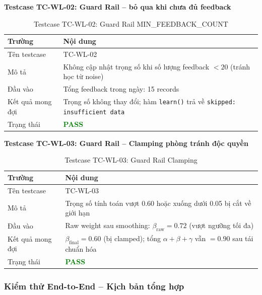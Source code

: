 \documentclass[12pt,a4paper]{report}
\begin{document}
\textbf{Testcase TC-WL-02: Guard Rail -- bỏ qua khi chưa đủ feedback}

\begin{table}[htbp]
\centering
\renewcommand{\arraystretch}{1.3}
\begin{tabular}{|l|p{8cm}|}
\hline
\rowcolor[HTML]{EFEFEF}
\textbf{Trường} & \textbf{Nội dung} \\ \hline
Tên testcase & TC-WL-02 \\ \hline
Mô tả & Không cập nhật trọng số khi số lượng feedback $< 20$ (tránh học từ noise) \\ \hline
Đầu vào & Tổng feedback trong ngày: 15 records \\ \hline
Kết quả mong đợi & Trọng số không thay đổi; hàm \texttt{learn()} trả về \texttt{skipped: insufficient data} \\ \hline
Trạng thái & \textcolor{green}{\textbf{PASS}} \\ \hline
\end{tabular}
\caption{Testcase TC-WL-02: Guard Rail MIN\_FEEDBACK\_COUNT}
\end{table}

\textbf{Testcase TC-WL-03: Guard Rail -- Clamping phòng tránh độc quyền}

\begin{table}[htbp]
\centering
\renewcommand{\arraystretch}{1.3}
\begin{tabular}{|l|p{8cm}|}
\hline
\rowcolor[HTML]{EFEFEF}
\textbf{Trường} & \textbf{Nội dung} \\ \hline
Tên testcase & TC-WL-03 \\ \hline
Mô tả & Trọng số tính toán vượt 0.60 hoặc xuống dưới 0.05 bị cắt về giới hạn \\ \hline
Đầu vào & Raw weight sau smoothing: $\beta_{\text{raw}} = 0.72$ (vượt ngưỡng tối đa) \\ \hline
Kết quả mong đợi & $\beta_{\text{final}} = 0.60$ (bị clamped); tổng $\alpha + \beta + \gamma$ vẫn $= 0.90$ sau tái chuẩn hóa \\ \hline
Trạng thái & \textcolor{green}{\textbf{PASS}} \\ \hline
\end{tabular}
\caption{Testcase TC-WL-03: Guard Rail Clamping}
\end{table}

\subsubsection{Kiểm thử End-to-End -- Kịch bản tổng hợp}
\end{document}
